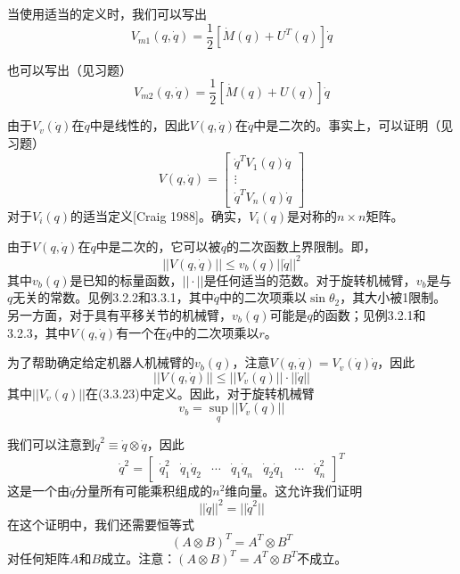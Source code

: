 \documentclass[12pt,a4paper]{ctexart}
\begin{document}
当使用适当的定义时，我们可以写出
\begin{equation}
V_{m1}(q,\dot{q}) = \frac{1}{2}[\dot{M}(q) + U^T(q)]\dot{q}
\end{equation}

也可以写出（见习题）
\begin{equation}
V_{m2}(q,\dot{q}) = \frac{1}{2}[\dot{M}(q) + U(q)]\dot{q}
\end{equation}

由于$V_v(\dot{q})$在$\dot{q}$中是线性的，因此$V(q,\dot{q})$在$\dot{q}$中是二次的。事实上，可以证明（见习题）
\begin{equation}
V(q,\dot{q}) = \begin{bmatrix} \dot{q}^T V_1(q)\dot{q} \\ \vdots \\ \dot{q}^T V_n(q)\dot{q} \end{bmatrix}
\end{equation}
对于$V_i(q)$的适当定义[Craig 1988]。确实，$V_i(q)$是对称的$n \times n$矩阵。

由于$V(q,\dot{q})$在$\dot{q}$中是二次的，它可以被$\dot{q}$的二次函数上界限制。即，
\begin{equation}
||V(q,\dot{q})|| \leq v_b(q)||\dot{q}||^2
\end{equation}
其中$v_b(q)$是已知的标量函数，$||\cdot||$是任何适当的范数。对于旋转机械臂，$v_b$是与$q$无关的常数。见例3.2.2和3.3.1，其中$\dot{q}$中的二次项乘以$\sin\theta_2$，其大小被1限制。另一方面，对于具有平移关节的机械臂，$v_b(q)$可能是$q$的函数；见例3.2.1和3.2.3，其中$V(q,\dot{q})$有一个在$\dot{q}$中的二次项乘以$r$。

为了帮助确定给定机器人机械臂的$v_b(q)$，注意$V(q,\dot{q}) = V_v(\dot{q})\dot{q}$，因此
\begin{equation}
||V(q,\dot{q})|| \leq ||V_v(q)|| \cdot ||\dot{q}||
\end{equation}
其中$||V_v(q)||$在(3.3.23)中定义。因此，对于旋转机械臂
\begin{equation}
v_b = \sup_{q} ||V_v(q)||
\end{equation}

我们可以注意到$\dot{q}^2 \equiv \dot{q} \otimes \dot{q}$，因此
\begin{equation}
\dot{q}^2 = \begin{bmatrix} \dot{q}_1^2 & \dot{q}_1\dot{q}_2 & \cdots & \dot{q}_1\dot{q}_n & \dot{q}_2\dot{q}_1 & \cdots & \dot{q}_n^2 \end{bmatrix}^T
\end{equation}
这是一个由$\dot{q}$分量所有可能乘积组成的$n^2$维向量。这允许我们证明
\begin{equation}
||\dot{q}||^2 = ||\dot{q}^2||
\end{equation}
在这个证明中，我们还需要恒等式
\begin{equation}
(A \otimes B)^T = A^T \otimes B^T
\end{equation}
对任何矩阵$A$和$B$成立。注意：$(A \otimes B)^T = A^T \otimes B^T$不成立。
\end{document}
